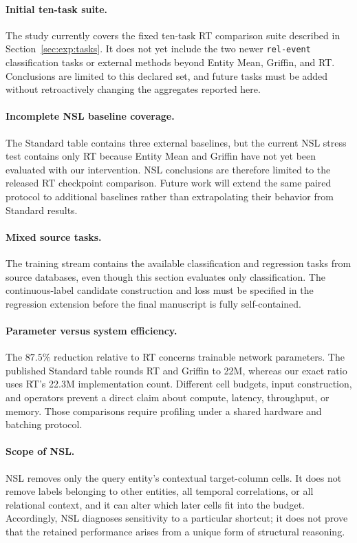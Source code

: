 \paragraph{Initial ten-task suite.}
The study currently covers the fixed ten-task RT comparison suite described
in Section~\ref{sec:exp:tasks}. It does not yet include the two newer
\texttt{rel-event} classification tasks or external methods beyond Entity
Mean, Griffin, and RT. Conclusions are limited to this declared set, and
future tasks must be added without retroactively changing the aggregates
reported here.

\paragraph{Incomplete NSL baseline coverage.}
The Standard table contains three external baselines, but the current NSL
stress test contains only RT because Entity Mean and Griffin have not yet
been evaluated with our intervention. NSL conclusions are therefore limited
to the released RT checkpoint comparison. Future work will extend the same
paired protocol to additional baselines rather than extrapolating their
behavior from Standard results.

\paragraph{Mixed source tasks.}
The training stream contains the available classification and regression
tasks from source databases, even though this section evaluates only
classification. The continuous-label candidate construction and loss must
be specified in the regression extension before the final manuscript is
fully self-contained.

\paragraph{Parameter versus system efficiency.}
The \(87.5\%\) reduction relative to RT concerns trainable network
parameters. The published Standard table rounds RT and Griffin to 22M,
whereas our exact ratio uses RT's 22.3M implementation count. Different cell
budgets, input construction, and operators prevent a direct claim about
compute, latency, throughput, or memory. Those comparisons require profiling
under a shared hardware and batching protocol.

\paragraph{Scope of NSL.}
NSL removes only the query entity's contextual target-column cells. It does
not remove labels belonging to other entities, all temporal correlations,
or all relational context, and it can alter which later cells fit into the
budget. Accordingly, NSL diagnoses sensitivity to a particular shortcut;
it does not prove that the retained performance arises from a unique form
of structural reasoning.

